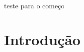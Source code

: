 \documentclass[csgeo,tcc]{unipampa}
\begin{document}
teste para o começo
\cite{didana2010}
\cite{tese_andrea}

\chapter{Introdução}




\end{document}
